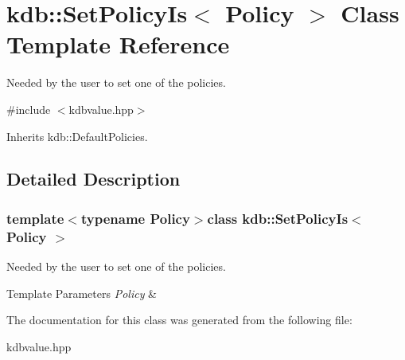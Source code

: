 \hypertarget{classkdb_1_1SetPolicyIs}{\section{kdb\-:\-:Set\-Policy\-Is$<$ Policy $>$ Class Template Reference}
\label{classkdb_1_1SetPolicyIs}
}


Needed by the user to set one of the policies.  




{\ttfamily \#include $<$kdbvalue.\-hpp$>$}



Inherits kdb\-::\-Default\-Policies.



\subsection{Detailed Description}
\subsubsection*{template$<$typename Policy$>$class kdb\-::\-Set\-Policy\-Is$<$ Policy $>$}

Needed by the user to set one of the policies. 


\begin{DoxyTemplParams}{Template Parameters}
{\em Policy} & \\
\hline
\end{DoxyTemplParams}


The documentation for this class was generated from the following file\-:\begin{DoxyCompactItemize}
\item 
kdbvalue.\-hpp\end{DoxyCompactItemize}
